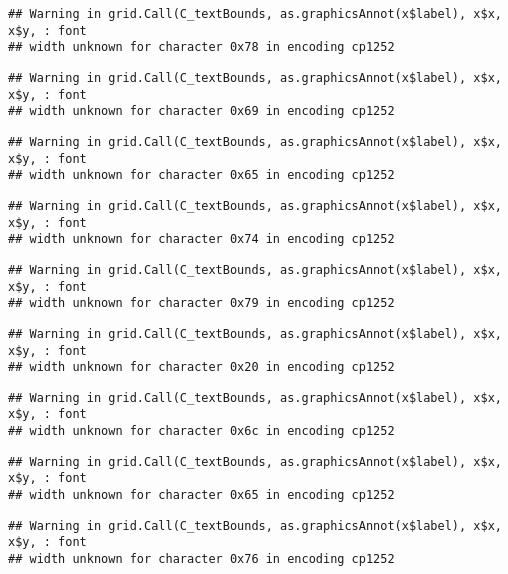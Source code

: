 \documentclass[
]{article}
\begin{document}
\begin{verbatim}
## Warning in grid.Call(C_textBounds, as.graphicsAnnot(x$label), x$x, x$y, : font
## width unknown for character 0x78 in encoding cp1252
\end{verbatim}

\begin{verbatim}
## Warning in grid.Call(C_textBounds, as.graphicsAnnot(x$label), x$x, x$y, : font
## width unknown for character 0x69 in encoding cp1252
\end{verbatim}

\begin{verbatim}
## Warning in grid.Call(C_textBounds, as.graphicsAnnot(x$label), x$x, x$y, : font
## width unknown for character 0x65 in encoding cp1252
\end{verbatim}

\begin{verbatim}
## Warning in grid.Call(C_textBounds, as.graphicsAnnot(x$label), x$x, x$y, : font
## width unknown for character 0x74 in encoding cp1252
\end{verbatim}

\begin{verbatim}
## Warning in grid.Call(C_textBounds, as.graphicsAnnot(x$label), x$x, x$y, : font
## width unknown for character 0x79 in encoding cp1252
\end{verbatim}

\begin{verbatim}
## Warning in grid.Call(C_textBounds, as.graphicsAnnot(x$label), x$x, x$y, : font
## width unknown for character 0x20 in encoding cp1252
\end{verbatim}

\begin{verbatim}
## Warning in grid.Call(C_textBounds, as.graphicsAnnot(x$label), x$x, x$y, : font
## width unknown for character 0x6c in encoding cp1252
\end{verbatim}

\begin{verbatim}
## Warning in grid.Call(C_textBounds, as.graphicsAnnot(x$label), x$x, x$y, : font
## width unknown for character 0x65 in encoding cp1252
\end{verbatim}

\begin{verbatim}
## Warning in grid.Call(C_textBounds, as.graphicsAnnot(x$label), x$x, x$y, : font
## width unknown for character 0x76 in encoding cp1252
\end{verbatim}
\end{document}
